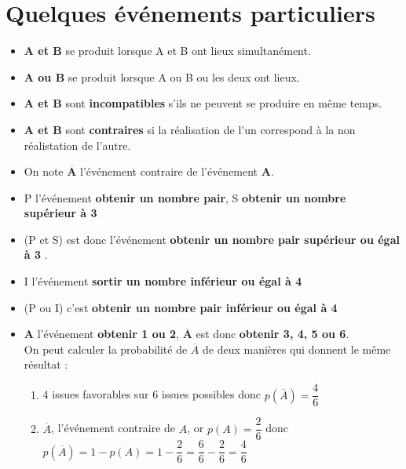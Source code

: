 \section{Quelques événements particuliers}
\begin{definition}
    \begin{itemize}
        \item \textbf{\og A et B\fg{}} se produit lorsque A et B ont lieux simultanément.
        \item \textbf{\og A ou B\fg{}} se produit lorsque A ou B ou les deux ont lieux.
        \item \textbf{\og A \fg{} et \og B\fg{}} sont \textbf{incompatibles} s'ils ne peuvent se produire en même temps.
        \item \textbf{\og A \fg{} et \og B\fg{}} sont \textbf{contraires} si la réalisation de l'un correspond à la non réalistation de l'autre.
        \item On note $\mathbf{\overline{A}}$ l'événement contraire de l'événement $\mathbf{A}$.
    \end{itemize}
\end{definition}

\begin{exemples*1}

    \begin{itemize}
        \item P l'événement \textbf{\og obtenir un nombre pair\fg{}}, S \textbf{\og obtenir un nombre supérieur à 3\fg{}}
        \item (P et S) est donc l'événement \textbf{\og obtenir un nombre pair supérieur ou égal à 3\fg{}  }.
        \item I l'événement \textbf{\og sortir un nombre inférieur ou égal à 4\fg{}}
        \item (P ou I) c'est \textbf{\og obtenir un nombre pair inférieur ou égal à 4\fg{}}
        \item \textbf{A} l'événement \textbf{\og obtenir 1 ou 2\fg{}}, $\mathbf{\overline{A}}$ est donc \textbf{\og obtenir 3, 4, 5 ou 6\fg{}}.\\
        On peut calculer la probabilité de $\overline{A}$ de deux manières qui donnent le même résultat :
            \begin{enumerate}
                \item 4 issues favorables sur 6 issues possibles donc $p(\overline{A})=\dfrac{4}{6}$
                \item $\overline{A}$, l'événement contraire de $A$, or $p(A)=\dfrac{2}{6}$ donc $p(\overline{A})=1-p(A)=1-\dfrac{2}{6}=\dfrac{6}{6}-\dfrac{2}{6}=\dfrac{4}{6}$
            \end{enumerate}
    \end{itemize}
\end{exemples*1}

